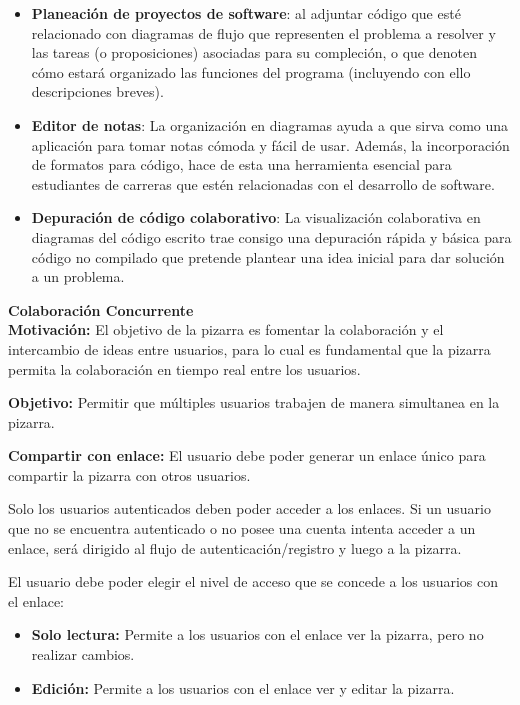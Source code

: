 \documentclass[a4paper, oneside, final]{scrartcl}
\begin{document}
\begin{itemize}
  \item \textbf{Planeación de proyectos de software}: al adjuntar código que esté
    relacionado con diagramas de flujo que representen el problema a resolver y las
    tareas (o proposiciones) asociadas para su compleción, o que denoten cómo estará
    organizado las funciones del programa (incluyendo con ello descripciones
    breves).
  \item \textbf{Editor de notas}: La organización en diagramas ayuda a que sirva como una
    aplicación para tomar notas cómoda y fácil de usar. Además, la incorporación de
    formatos para código, hace de esta una herramienta esencial para estudiantes
    de carreras que estén relacionadas con el desarrollo de software.
  \item \textbf{Depuración de código colaborativo}: La visualización colaborativa en
    diagramas del código escrito trae consigo una depuración rápida y básica para
    código no compilado que pretende plantear una idea inicial para dar solución
    a un problema.
\end{itemize}

\noindent
\textbf{\large Colaboración Concurrente}\\ %

\textbf{Motivación:} El objetivo de la pizarra es fomentar la colaboración y el intercambio de ideas entre usuarios, para lo cual es fundamental que la pizarra permita la colaboración en tiempo real entre los usuarios.

\textbf{Objetivo:} Permitir que múltiples usuarios trabajen de manera simultanea en la pizarra.

\textbf{Compartir con enlace:} El usuario debe poder generar un enlace único para compartir la pizarra con otros usuarios. 

Solo los usuarios autenticados deben poder acceder a los enlaces. Si un usuario que no se encuentra autenticado o no posee una cuenta intenta acceder a un enlace, será dirigido al flujo de autenticación/registro y luego a la pizarra.
        
El usuario debe poder elegir el nivel de acceso que se concede a los usuarios con el enlace:
\begin{itemize}
    \item \textbf{Solo lectura:} Permite a los usuarios con el enlace ver la pizarra, pero no realizar cambios.
    \item \textbf{Edición:} Permite a los usuarios con el enlace ver y editar la pizarra.
\end{itemize}
\end{document}
